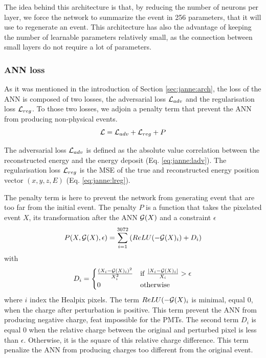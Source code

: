 \documentclass[../main.tex]{subfiles}
\begin{document}
The idea behind this architecture is that, by reducing the number of neurons per layer, we force the network to summarize the event in 256 parameters, that it will use to regenerate an event. This architecture has also the advantage of keeping the number of learnable parameters relatively small, as the connection between small layers do not require a lot of parameters.

\subsubsection{ANN loss}

As it was mentioned in the introduction of Section \ref{sec:janne:arch}, the loss of the ANN is composed of two losses, the adversarial loss ${\cal L}_{adv}$ and the regularisation loss ${\cal L}_{reg}$. To those two losses, we adjoin a penalty term that prevent the ANN from producing non-physical events.
\begin{equation*}
  {\cal L} = {\cal L}_{adv} + {\cal L}_{reg} + P
\end{equation*}

The adversarial loss ${\cal L}_{adv}$ is defined as the absolute value correlation between the reconstructed energy and the energy deposit (Eq. \ref{eq:janne:ladv}). The regularisation loss ${\cal L}_{reg}$ is the MSE of the true and reconstructed energy position vector $(x, y, z, E)$ (Eq. \ref{eq:janne:lreg}).


The penalty term is here to prevent the network from generating event that are too far from the initial event. The penalty $P$ is a function that takes the pixelated event $X$, its transformation after the ANN ${\cal G}(X)$ and a constraint $\epsilon$
\begin{equation}
  P(X, {\cal G}(X), \epsilon) = \sum_{i=1}^{3072} \left( ReLU(-{\cal G}(X)_i) + D_i \right)
\end{equation}
with
\begin{equation}
  D_i = \begin{cases}
    \frac{(X_i - {\cal G}(X)_i)^2}{X_i^2}& \text{if } \frac{|X_i - {\cal G}(X)_i|}{X_i} > \epsilon \\
    0& \text{otherwise}
  \end{cases}
\end{equation}
where $i$ index the Healpix pixels. The term $ReLU(-{\cal G}(X)_i$ is minimal, equal 0, when the charge after perturbation is positive. This term prevent the ANN from producing negative charge, feat impossible for the PMTs. The second term $D_i$ is equal 0 when the relative charge between the original and perturbed pixel is less than $\epsilon$. Otherwise, it is the square of this relative charge difference. This term penalize the ANN from producing charges too different from the original event.
\hfill
\end{document}
